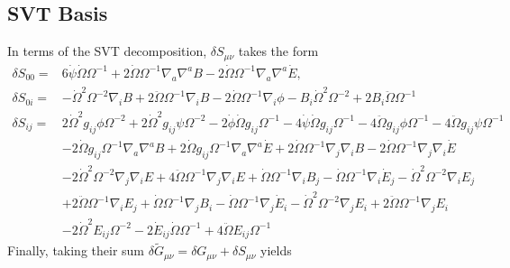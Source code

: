 \documentclass[10pt,letterpaper]{article}
\numberwithin{equation}{subsection}
\begin{document}
\subsection{SVT Basis}
In terms of the SVT decomposition,
$\delta S_{\mu\nu}$ takes the form 
\begin{align}
\delta S_{00}={}&6 \dot{\psi} \dot{\Omega} \Omega^{-1}
 + 2 \dot{\Omega} \Omega^{-1} \nabla_{a}\nabla^{a}B
 - 2 \dot{\Omega} \Omega^{-1} \nabla_{a}\nabla^{a}\dot{E},
\nonumber\\
\delta S_{0i}={}&- \dot{\Omega}^2 \Omega^{-2} \nabla_{i}B
 + 2 \ddot{\Omega} \Omega^{-1} \nabla_{i}B
 - 2 \dot{\Omega} \Omega^{-1} \nabla_{i}\phi
- B_{i} \dot{\Omega}^2 \Omega^{-2}
 + 2 B_{i} \ddot{\Omega} \Omega^{-1}
\nonumber\\
\delta S_{ij}={}&2 \dot{\Omega}^2 g_{ij} \phi \Omega^{-2}
 + 2 \dot{\Omega}^2 g_{ij} \psi \Omega^{-2}
 - 2 \dot{\phi} \dot{\Omega} g_{ij} \Omega^{-1}
 - 4 \dot{\psi} \dot{\Omega} g_{ij} \Omega^{-1}
 - 4 \ddot{\Omega} g_{ij} \phi \Omega^{-1}
 - 4 \ddot{\Omega} g_{ij} \psi \Omega^{-1}\nonumber\\
& - 2 \dot{\Omega} g_{ij} \Omega^{-1} \nabla_{a}\nabla^{a}B
 + 2 \dot{\Omega} g_{ij} \Omega^{-1} \nabla_{a}\nabla^{a}\dot{E}
 + 2 \dot{\Omega} \Omega^{-1} \nabla_{j}\nabla_{i}B
 - 2 \dot{\Omega} \Omega^{-1} \nabla_{j}\nabla_{i}\dot{E}\nonumber\\
& - 2 \dot{\Omega}^2 \Omega^{-2} \nabla_{j}\nabla_{i}E
 + 4 \ddot{\Omega} \Omega^{-1} \nabla_{j}\nabla_{i}E
+ \dot{\Omega} \Omega^{-1} \nabla_{i}B_{j}
 -  \dot{\Omega} \Omega^{-1} \nabla_{i}\dot{E}_{j}
 -  \dot{\Omega}^2 \Omega^{-2} \nabla_{i}E_{j}
\nonumber\\
& + 2 \ddot{\Omega} \Omega^{-1} \nabla_{i}E_{j}
 + \dot{\Omega} \Omega^{-1} \nabla_{j}B_{i}
 -  \dot{\Omega} \Omega^{-1} \nabla_{j}\dot{E}_{i}
 -  \dot{\Omega}^2 \Omega^{-2} \nabla_{j}E_{i}
 + 2 \ddot{\Omega} \Omega^{-1} \nabla_{j}E_{i}
\nonumber\\
&-2 \dot{\Omega}^2 E_{ij} \Omega^{-2}
 - 2 \dot{E}_{ij} \dot{\Omega} \Omega^{-1}
 + 4 \ddot{\Omega} E_{ij} \Omega^{-1}
\end{align}
Finally, taking their sum $\delta \tilde G_{\mu\nu} = \delta G_{\mu\nu} + \delta S_{\mu\nu}$ yields 
\end{document}
